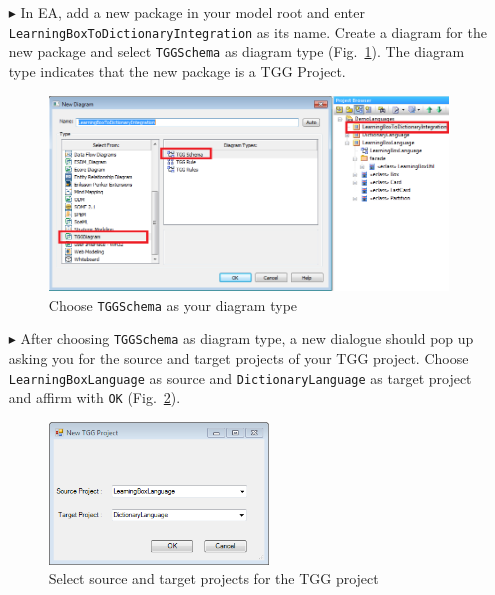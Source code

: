 \begin{enumerate}
\item[$\blacktriangleright$] In EA, add a new package in your model root and enter \texttt{Learning\-Box\-To\-Dictionary\-Integration} as its name. 
Create a diagram for the new package and select \texttt{TGGSchema} as diagram type (Fig.~\ref{fig:tgg_diagram_type}). The diagram type indicates that the new package is a TGG Project. 

\begin{figure}[htbp]
\begin{center}
  \includegraphics[width=\textwidth]{pics/tggBilder/tggSchema/tgg1}
  \caption{Choose \texttt{TGGSchema} as your diagram type}  
  \label{fig:tgg_diagram_type}
\end{center}
\end{figure}

\item[$\blacktriangleright$] After choosing \texttt{TGGSchema} as diagram type, a new dialogue should pop up asking you for the source and target projects of your TGG project. 
Choose \texttt{Learning\-Box\-Language} as source and \texttt{Dictionary\-Language} as target project and affirm with \texttt{OK} (Fig.~\ref{fig:select_source_target}).

\begin{figure}[htbp]
\begin{center}
  \includegraphics[width=0.55\textwidth]{pics/tggBilder/tggSchema/tgg2}
  \caption{Select source and target projects for the TGG project}  
  \label{fig:select_source_target}
\end{center}
\end{figure}
\end{enumerate}

